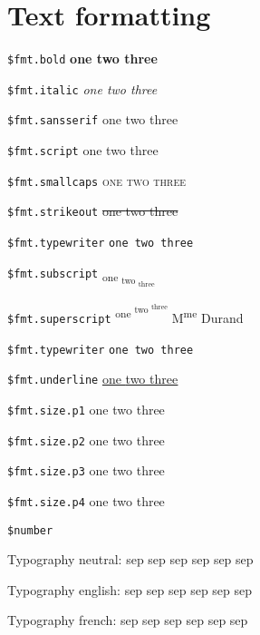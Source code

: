 \documentclass[demo]{pyscribe}
\newcommand\scripttext[1]{{\fontfamily{pzc}\selectfont\large#1}}
\begin{document}
\section{Text formatting}



\par\medskip
\texttt{\$fmt.bold}  \textbf{one
 \textbf{two
 \textbf{three}}}
\par\medskip
\texttt{\$fmt.italic}  \textit{one
 \textit{two
 \textit{three}}}
\par\medskip
\texttt{\$fmt.sansserif}  \textsf{one
 \textsf{two
 \textsf{three}}}
\par\medskip
\texttt{\$fmt.script}  \scripttext{one
 \scripttext{two
 \scripttext{three}}}
\par\medskip
\texttt{\$fmt.smallcaps}  \textsc{one
 \textsc{two
 \textsc{three}}}
\par\medskip
\texttt{\$fmt.strikeout}  \sout{one
 \sout{two
 \sout{three}}}
\par\medskip
\texttt{\$fmt.typewriter}  \texttt{one
 \texttt{two
 \texttt{three}}}
\par\medskip
\texttt{\$fmt.subscript}  \textsubscript{one
 \textsubscript{two
 \textsubscript{three}}}
\par\medskip
\texttt{\$fmt.superscript}  \textsuperscript{one
 \textsuperscript{two
 \textsuperscript{three}}} M\textsuperscript{me} Durand
\par\medskip
\texttt{\$fmt.typewriter}  \texttt{one
 \texttt{two
 \texttt{three}}}
\par\medskip
\texttt{\$fmt.underline}  \underline{one
 \underline{two
 \underline{three}}}
\par\medskip
\texttt{\$fmt.size.p1}  {\large one
 {\large two
 {\large three}}}
\par\medskip
\texttt{\$fmt.size.p2}  {\Large one
 {\Large two
 {\Large three}}}
\par\medskip
\texttt{\$fmt.size.p3}  {\LARGE one
 {\LARGE two
 {\LARGE three}}}
\par\medskip
\texttt{\$fmt.size.p4}  {\Huge one
 {\Huge two
 {\Huge three}}}

\par\medskip
\texttt{\$number} \\ 
\medskip
\par{\raggedright
{}Typography neutral:
sep 
sep 
sep 
sep 
sep 
sep 
\par \medskip
{}Typography english:
sep 
sep 
sep 
sep 
sep 
sep 
\par \medskip
{}Typography french:
sep 
sep 
sep 
sep 
sep 
sep 
\par \medskip\par}
\end{document}

